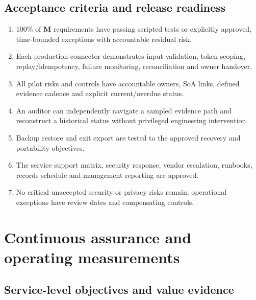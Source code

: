 \documentclass[10pt,letterpaper]{article}
\begin{document}
\subsection{Acceptance criteria and release readiness}
\begin{enumerate}
\item 100\% of \textbf{M} requirements have passing scripted tests or explicitly approved, time-bounded exceptions with accountable residual risk.
\item Each production connector demonstrates input validation, token scoping, replay/idempotency, failure monitoring, reconciliation and owner handover.
\item All pilot risks and controls have accountable owners, SoA links, defined evidence cadence and explicit current/overdue status.
\item An auditor can independently navigate a sampled evidence path and reconstruct a historical status without privileged engineering intervention.
\item Backup restore and exit export are tested to the approved recovery and portability objectives.
\item The service support matrix, security response, vendor escalation, runbooks, records schedule and management reporting are approved.
\item No critical unaccepted security or privacy risks remain; operational exceptions have review dates and compensating controls.
\end{enumerate}

\section{Continuous assurance and operating measurements}
\subsection{Service-level objectives and value evidence}
\small
\end{document}
